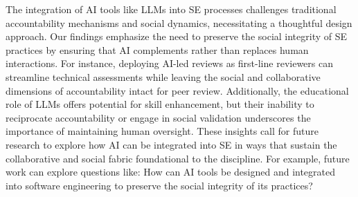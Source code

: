 The integration of AI tools like LLMs into SE processes challenges traditional accountability mechanisms and social dynamics, necessitating a thoughtful design approach. Our findings emphasize the need to preserve the social integrity of SE practices by ensuring that AI complements rather than replaces human interactions. For instance, deploying AI-led reviews as first-line reviewers can streamline technical assessments while leaving the social and collaborative dimensions of accountability intact for peer review. Additionally, the educational role of LLMs offers potential for skill enhancement, but their inability to reciprocate accountability or engage in social validation underscores the importance of maintaining human oversight. These insights call for future research to explore how AI can be integrated into SE in ways that sustain the collaborative and social fabric foundational to the discipline. For example, future work can explore questions like: How can AI tools be designed and integrated into software engineering to preserve the social integrity of its practices?
